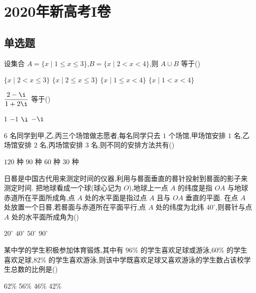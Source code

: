 \chapter{2020年新高考I卷}

\section{单选题}

\begin{problem}
设集合 \(A=\{x\mid 1\le x\le 3\}\),\(B=\{x\mid 2<x<4\}\),则 \(A\cup B\) 等于(\quad)

\choices
    {\(\{x\mid 2<x\le 3\}\)}
    {\(\{x\mid 2\le x\le 3\}\)}
    {\(\{x\mid 1\le x<4\}\)}
    {\(\{x\mid 1<x<4\}\)}
\end{problem}

\begin{problem}
\(\dfrac{2-\i}{1+2\i}\) 等于(\quad)

\choices
    {\(1\)}
    {\(-1\)}
    {\(\i\)}
    {\(-\i\)}
\end{problem}

\begin{problem}
\(6\) 名同学到甲,乙,丙三个场馆做志愿者,每名同学只去 \(1\) 个场馆,甲场馆安排 \(1\) 名,乙场馆安排 \(2\) 名,丙场馆安排 \(3\) 名,则不同的安排方法共有(\quad)

\choices
    {\(120\) 种}
    {\(90\) 种}
    {\(60\) 种}
    {\(30\) 种}
\end{problem}

\begin{problem}
日晷是中国古代用来测定时间的仪器,利用与晷面垂直的晷针投射到晷面的影子来测定时间. 把地球看成一个球(球心记为 \(O\)),地球上一点 \(A\) 的纬度是指 \(OA\) 与地球赤道所在平面所成角,点 \(A\) 处的水平面是指过点 \(A\) 且与 \(OA\) 垂直的平面. 在点 \(A\) 处放置一个日晷,若晷面与赤道所在平面平行,点 \(A\) 处的纬度为北纬 \(40^\circ\),则晷针与点 \(A\) 处的水平面所成角为(\quad)

\begin{center}
\end{center}

\choices
    {\(20^\circ\)}
    {\(40^\circ\)}
    {\(50^\circ\)}
    {\(90^\circ\)}
\end{problem}

\begin{problem}
某中学的学生积极参加体育锻炼,其中有 \(96\%\) 的学生喜欢足球或游泳,\(60\%\) 的学生喜欢足球,\(82\%\) 的学生喜欢游泳,则该中学既喜欢足球又喜欢游泳的学生数占该校学生总数的比例是(\quad)

\choices
    {62\%}
    {56\%}
    {46\%}
    {42\%}
\end{problem}

